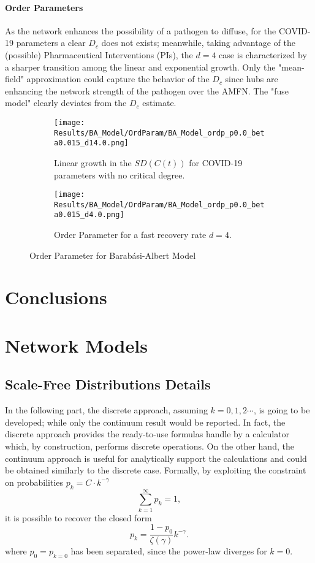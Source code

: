 \documentclass[a4paper,10pt,twoside]{book} %
\theoremstyle{definition}
\begin{document}
\subsubsection*{Order Parameters}
As the network enhances the possibility of a pathogen to diffuse, for the COVID-19 parameters a clear $D_c$ does not exists; meanwhile, taking advantage of the (possible) Pharmaceutical Interventions (PIs), the $d = 4$ case is characterized by a sharper transition among the linear and exponential growth. Only the "mean-field" approximation could capture the behavior of the $ D_c$ since hubs are enhancing the network strength of the pathogen over the AMFN. The "fuse model" clearly deviates from the $ D_c$ estimate. 
\begin{figure}[t]
	\begin{subfigure}[t]{0.48\linewidth}
		\centering
		\texttt{[image: Results/BA\_Model/OrdParam/BA\_Model\_ordp\_p0.0\_beta0.015\_d14.0.png]}
		\caption{Linear growth in the $SD(C(t))$ for COVID-19 parameters with no critical degree.}
		\label{fig:Ordp_BA_d14}
	\end{subfigure}
	\hfill
	\begin{subfigure}[t]{0.48\linewidth}
		\centering
		\texttt{[image: Results/BA\_Model/OrdParam/BA\_Model\_ordp\_p0.0\_beta0.015\_d4.0.png]}
		\caption{Order Parameter for a fast recovery rate $ d = 4$.}
		\label{fig:Ordp_BA_COVID_d1}
	\end{subfigure}
	\caption{Order Parameter for Barabási-Albert Model}
	\label{fig:Ordp_BA_COVID}
\end{figure}


\chapter{Conclusions}


\appendix
\chapter{Network Models}

\section{Scale-Free Distributions Details}
\label{sec:SFD_details}
In the following part, the discrete approach, assuming $k = 0,1,2\cdots$, is going to be developed; while only the continuum result would be reported. In fact, the discrete approach provides the ready-to-use formulas handle by a calculator which, by construction, performs discrete operations. On the other hand, the continuum approach is useful for analytically support the calculations and could be obtained similarly to the discrete case.
Formally, by exploiting the constraint on probabilities $p_k = C\cdot k^{-\gamma}$ \[\sum_{k=1}^{\infty} p_k = 1,\] it is possible to recover the closed form \cite{barabasi::2016networkbook}
\begin{equation}
	p_k = \frac{1-p_0}{\zeta(\gamma)}k^{-\gamma}.
	\label{eq:p_scalefree}
\end{equation}
where $p_0 = p_{k=0}$ has been separated, since the power-law diverges for $k=0$.
\end{document}
